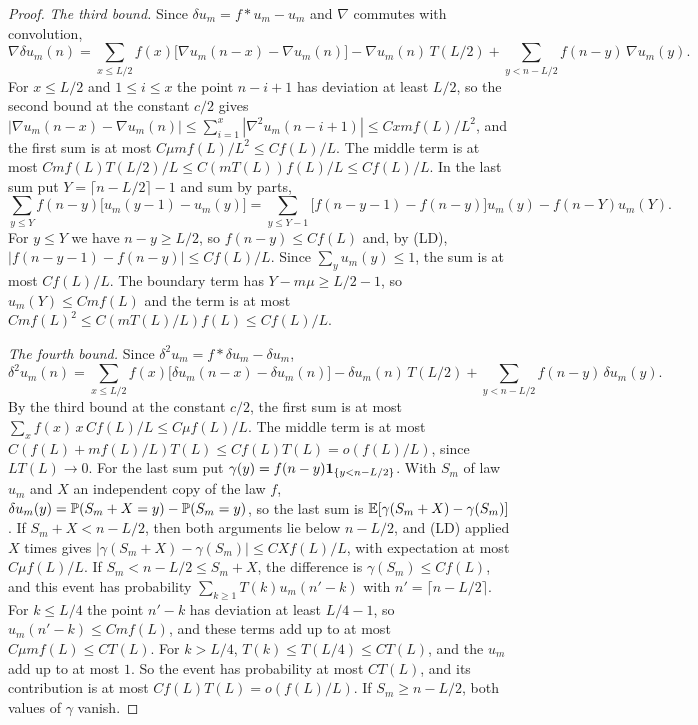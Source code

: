 \begin{proof}
\emph{The third bound.} Since $\delta u_m=f*u_m-u_m$ and $\nabla$ commutes with convolution,
\[
 \nabla\delta u_m(n)=\sum_{x\le L/2}f(x)\bigl[\nabla u_m(n-x)-\nabla u_m(n)\bigr]
 -\nabla u_m(n)\,T(L/2)+\sum_{y<n-L/2}f(n-y)\,\nabla u_m(y).
\]
For $x\le L/2$ and $1\le i\le x$ the point $n-i+1$ has deviation at least $L/2$, so the second
bound at the constant $c/2$ gives
$|\nabla u_m(n-x)-\nabla u_m(n)|\le\sum_{i=1}^{x}|\nabla^2u_m(n-i+1)|\le Cxmf(L)/L^2$, and the first
sum is at most $C\mu mf(L)/L^2\le Cf(L)/L$. The middle term is at most
$Cmf(L)T(L/2)/L\le C(mT(L))f(L)/L\le Cf(L)/L$. In the last sum put $Y=\lceil n-L/2\rceil-1$ and
sum by parts,
\[
 \sum_{y\le Y}f(n-y)\bigl[u_m(y-1)-u_m(y)\bigr]
 =\sum_{y\le Y-1}\bigl[f(n-y-1)-f(n-y)\bigr]u_m(y)-f(n-Y)u_m(Y).
\]
For $y\le Y$ we have $n-y\ge L/2$, so $f(n-y)\le Cf(L)$ and, by (LD),
$|f(n-y-1)-f(n-y)|\le Cf(L)/L$. Since $\sum_yu_m(y)\le1$, the sum is at most $Cf(L)/L$. The
boundary term has $Y-m\mu\ge L/2-1$, so $u_m(Y)\le Cmf(L)$ and the term is at most
$Cmf(L)^2\le C(mT(L)/L)f(L)\le Cf(L)/L$.

\emph{The fourth bound.} Since $\delta^2u_m=f*\delta u_m-\delta u_m$,
\[
 \delta^2u_m(n)=\sum_{x\le L/2}f(x)\bigl[\delta u_m(n-x)-\delta u_m(n)\bigr]
 -\delta u_m(n)\,T(L/2)+\sum_{y<n-L/2}f(n-y)\,\delta u_m(y).
\]
By the third bound at the constant $c/2$, the first sum is at most
$\sum_xf(x)\,x\,Cf(L)/L\le C\mu f(L)/L$. The middle term is at most
$C(f(L)+mf(L)/L)T(L)\le Cf(L)T(L)=o(f(L)/L)$, since $LT(L)\to0$. For the last sum put
$\gamma(y)=f(n-y)\mathbf{1}_{\{y<n-L/2\}}$. With $S_m$ of law $u_m$ and $X$ an independent copy of the
law $f$, $\delta u_m(y)=\mathbb{P}(S_m+X=y)-\mathbb{P}(S_m=y)$, so the last sum is
$\mathbb{E}[\gamma(S_m+X)-\gamma(S_m)]$. If $S_m+X<n-L/2$, then both arguments lie below $n-L/2$, and
(LD) applied $X$ times gives $|\gamma(S_m+X)-\gamma(S_m)|\le CXf(L)/L$, with expectation at most
$C\mu f(L)/L$. If $S_m<n-L/2\le S_m+X$, the difference is $\gamma(S_m)\le Cf(L)$, and this event
has probability $\sum_{k\ge1}T(k)u_m(n'-k)$ with $n'=\lceil n-L/2\rceil$. For $k\le L/4$ the
point $n'-k$ has deviation at least $L/4-1$, so $u_m(n'-k)\le Cmf(L)$, and these terms add up
to at most $C\mu mf(L)\le CT(L)$. For $k>L/4$, $T(k)\le T(L/4)\le CT(L)$, and the $u_m$ add up
to at most $1$. So the event has probability at most $CT(L)$, and its contribution is at most
$Cf(L)T(L)=o(f(L)/L)$. If $S_m\ge n-L/2$, both values of $\gamma$ vanish.
\end{proof}

